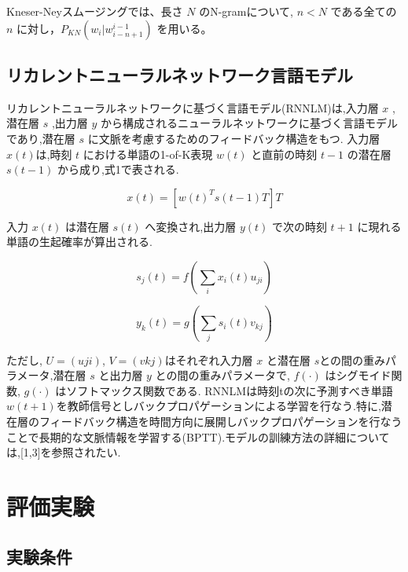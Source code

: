 Kneser-Neyスムージングでは、長さ $N$ のN-gramについて, $n  <  N$ である全ての $n$ に対し，$P_{KN} (w_i|w_{i-n+1}^{i-1})$ を用いる。

\subsection{リカレントニューラルネットワーク言語モデル}
リカレントニューラルネットワークに基づく言語モデル(RNNLM)は,入力層 $x$ ,潜在層 $s$ ,出力層 $y$ から構成されるニューラルネットワークに基づく言語モデルであり,潜在層 $s$ に文脈を考慮するためのフィードバック構造をもつ. 入力層 $x(t)$は,時刻 $t$ における単語の1-of-K表現 $w(t)$ と直前の時刻 $t−1$
の潜在層 $s(t−1)$ から成り,式1で表される.

\begin{equation}
		x(t) = [w(t)^T s(t-1)T]T
    \label{rnn1}
\end{equation}

入力 $x(t)$ は潜在層 $s(t)$ へ変換され,出力層 $y(t)$ で次の時刻 $t+1$ に現れる単語の生起確率が算出される.

\begin{equation}
		s_j(t) = f(\sum_i x_i(t) u_{ji})
    \label{rnn2}
\end{equation}

\begin{equation}
		y_k(t) = g(\sum_j s_i(t) v_{kj})
    \label{rnn3}
\end{equation}

ただし, $U=(uji)$, $V=(vkj)$はそれぞれ入力層 $x$ と潜在層 $s$との間の重みパラメータ,潜在層 $s$
と出力層 $y$ との間の重みパラメータで, $f(·)$ はシグモイド関数, $g(·)$ はソフトマックス関数である.
RNNLMは時刻tの次に予測すべき単語 $w(t+1)$を教師信号としバックプロパゲーションによる学習を行なう.特に,潜在層のフィードバック構造を時間方向に展開しバックプロパゲーションを行なうことで長期的な文脈情報を学習する(BPTT).モデルの訓練方法の詳細については,[1,3]を参照されたい.


\section{評価実験}
\subsection{実験条件}



